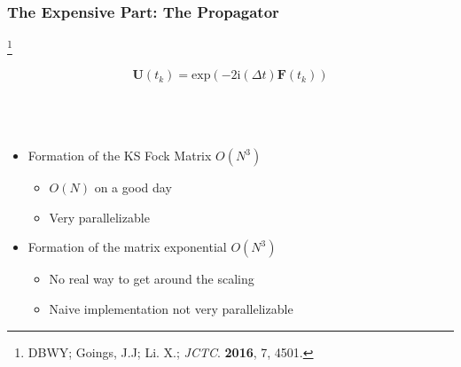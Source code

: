 \documentclass{beamer}
\newcommand{\bpar}[1]{\left( #1 \right)}                  %
\renewcommand{\exp}[1]{\mathrm{exp}\bpar{#1}}
\newcommand\blfootnote[1]{%
  \begingroup
  \renewcommand\thefootnote{}\footnote{#1}%
  \addtocounter{footnote}{-1}%
  \endgroup
}
\begin{document}
\begin{frame}
\frametitle{The Expensive Part: The Propagator}
\blfootnote{DBWY; Goings, J.J; Li. X.; \emph{JCTC}. \textbf{2016}, 7, 4501.}
{ \LARGE
\begin{equation*}
\mathbf{U}(t_k) = \exp{-2\mathrm{i}(\Delta t) \mathbf{F}(t_k)}
\end{equation*}
}
~\\
~\\
~\\


\begin{itemize}
  \item Formation of the KS Fock Matrix $O(N^3)$
  \begin{itemize}
    \normalsize
    \item $O(N)$ on a good day
    \item Very parallelizable
  \end{itemize}
  \item Formation of the matrix exponential $O(N^3)$
  \begin{itemize}
    \normalsize
    \item No real way to get around the scaling
    \item Naive implementation not very parallelizable
  \end{itemize}
\end{itemize}

\end{frame}
\end{document}
